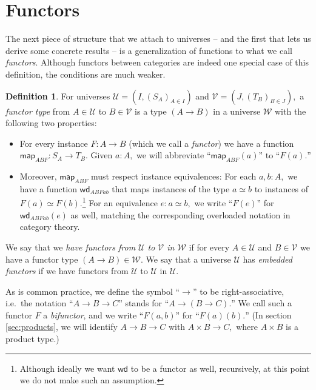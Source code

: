 \documentclass[a4paper]{article}
\theoremstyle{definition}
\newtheorem{definition}{Definition}[section]
\theoremstyle{remark}
\newcommand{\defn}{\emph}
\renewcommand{\equiv}{\simeq}
\newcommand{\U}{\mathcal{U}}
\newcommand{\V}{\mathcal{V}}
\newcommand{\W}{\mathcal{W}}
\newcommand{\nm}{\mathsf}
\newcommand{\map}{\nm{map}}
\newcommand{\congrArg}{\nm{wd}}
\begin{document}
\section{Functors}
\label{sec:functors}

The next piece of structure that we attach to universes -- and the first that lets us derive
some concrete results -- is a generalization of functions to what we call \defn{functors}.
Although functors between categories are indeed one special case of this definition, the
conditions are much weaker.

\begin{definition}
  For universes $\U = (I, (S_A)_{A \in I})$ and $\V = (J, (T_B)_{B \in J}),$ a
  \defn{functor type} from $A \in \U$ to $B \in \V$ is a type $(A \to B)$ in a universe $\W$
  with the following two properties:
  \begin{itemize}
    \item For every instance $F : A \to B$ (which we call a \defn{functor}) we have a
    function $\map_{ABF} : S_A \to T_B.$ Given $a : A,$ we will abbreviate
    ``$\map_{ABF}(a)$'' to ``$F(a).$''
    \item Moreover, $\map_{ABF}$ must respect instance equivalences: For each
    $a,b : A,$ we have a function $\congrArg_{ABFab}$ that maps instances of the type
    $a \equiv b$ to instances of $F(a) \equiv F(b).$\footnote{Although ideally we want
    $\congrArg$ to be a functor as well, recursively, at this point we do not make such an
    assumption.}
    For an equivalence $e : a \equiv b,$ we write ``$F(e)$'' for $\congrArg_{ABFab}(e)$ as
    well, matching the corresponding overloaded notation in category theory.
  \end{itemize}
  
  We say that we \defn{have functors from $\U$ to $\V$ in $\W$} if for every $A \in \U$ and
  $B \in \V$ we have a functor type $(A \to B) \in \W.$
  We say that a universe $\U$ has \defn{embedded functors} if we have functors from $\U$ to
  $\U$ in $\U.$

  As is common practice, we define the symbol ``$\to$'' to be right-associative, i.e.\ the
  notation ``$A \to B \to C$'' stands for ``$A \to (B \to C).$'' We call such a functor $F$ a
  \defn{bifunctor}, and we write ``$F(a,b)$'' for ``$F(a)(b).$'' (In section \ref{sec:products},
  we will identify $A \to B \to C$ with $A \times B \to C,$ where $A \times B$ is a product
  type.)
\end{definition}
\end{document}
